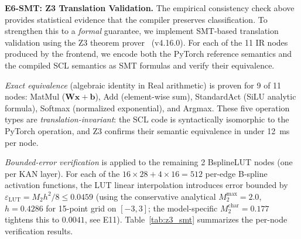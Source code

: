 \documentclass[journal,onecolumn]{IEEEtran}
\begin{document}
\vspace{4pt}
\noindent\textbf{E6-SMT: Z3 Translation Validation.}
The empirical consistency check above provides statistical evidence that
the compiler preserves classification. To strengthen this to a \emph{formal}
guarantee, we implement SMT-based translation validation using the Z3 theorem
prover~\cite{de2008z3} (v4.16.0). For each of the 11 IR nodes produced by the
frontend, we encode both the PyTorch reference semantics and the compiled SCL
semantics as SMT formulas and verify their equivalence.

\emph{Exact equivalence} (algebraic identity in Real arithmetic) is proven for
9 of 11 nodes: MatMul ($\mathbf{W}\mathbf{x}+\mathbf{b}$), Add (element-wise
sum), StandardAct (SiLU analytic formula), Softmax (normalized exponential),
and Argmax. These five operation types are \emph{translation-invariant}: the
SCL code is syntactically isomorphic to the PyTorch operation, and Z3 confirms
their semantic equivalence in under 12~ms per node.

\emph{Bounded-error verification} is applied to the remaining 2 BsplineLUT
nodes (one per KAN layer). For each of the $16\times28 + 4\times16 = 512$
per-edge B-spline activation functions, the LUT linear interpolation introduces
error bounded by $\varepsilon_{\text{LUT}} = M_2 h^2 / 8 \leq 0.0459$
(using the conservative analytical $M_2^{\max}=2.0$, $h=0.4286$ for 15-point grid on $[-3,3]$;
the model-specific $M_2^{\text{char}}=0.177$ tightens this to $0.0041$, see E11).
Table~\ref{tab:z3_smt} summarizes the per-node verification results.
\end{document}
